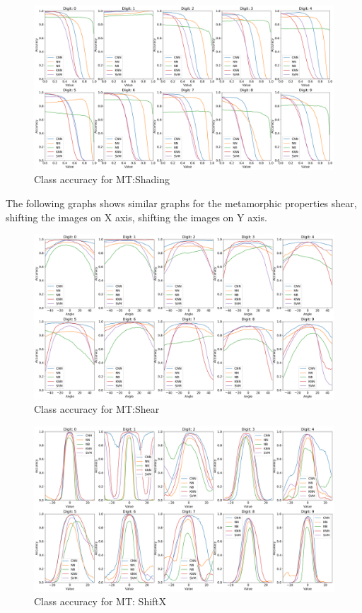     \begin{figure}[ht!]
    \centering
        \includegraphics[width=\textwidth]{chapters/results/MT/ShadeAll.png}
        \caption{Class accuracy for MT:Shading}
        \label{fig:Digit by misclassification for Shading MR}
    \end{figure}
    
    The following graphs shows similar graphs for the metamorphic properties shear, shifting the images on X axis, shifting the images on Y axis.
    
    \begin{figure}[H]
    \centering
        \includegraphics[width=\textwidth]{chapters/results/MT/ShearAll.png}
        \caption{Class accuracy for MT:Shear}
        \label{fig:Digit by misclassification for Shear MR}
    \end{figure}
    
    \begin{figure}[ht!]
    \centering
        \includegraphics[width=\textwidth]{chapters/results/MT/ShiftXAll.png}
        \caption{Class accuracy for MT: ShiftX}
        \label{fig:Rotate-misclass0}
    \end{figure}
    
